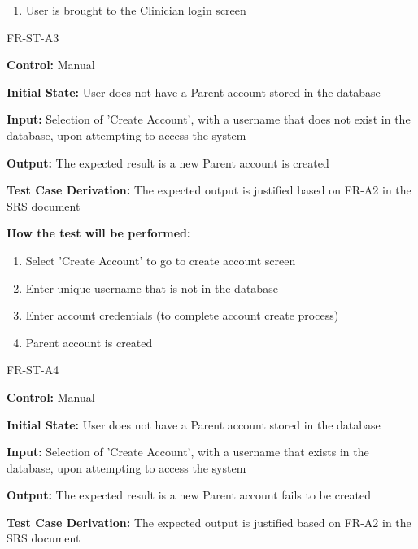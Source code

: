 \documentclass[12pt, titlepage]{article}
\begin{document}
\begin{itemize}
\begin{item}
\begin{mdframed}[linewidth=0.5mm]
\begin{enumerate}[noitemsep]
        \item User is brought to the Clinician login screen
      \end{enumerate}
  \end{mdframed}
  \end{item}
  \begin{item}
    FR-ST-A3
    \begin{mdframed}[linewidth=0.5mm]
      \textbf{Control:} Manual \par
      \textbf{Initial State:} User does not have a Parent account stored in the database \par
      \textbf{Input:} Selection of 'Create Account', with a username that does not exist in the database, upon attempting to access the system \par
      \textbf{Output:} The expected result is a new Parent account is created \par
      \textbf{Test Case Derivation:} The expected output is justified based on FR-A2 in the SRS document \par
      \textbf{How the test will be performed:}
      \begin{enumerate}[noitemsep]
        \item Select 'Create Account' to go to create account screen
        \item Enter unique username that is not in the database
        \item Enter account credentials (to complete account create process)
        \item Parent account is created
      \end{enumerate}
  \end{mdframed}
  \end{item}
  \begin{item}
    FR-ST-A4
    \begin{mdframed}[linewidth=0.5mm]
      \textbf{Control:} Manual \par
      \textbf{Initial State:} User does not have a Parent account stored in the database \par
      \textbf{Input:} Selection of 'Create Account', with a username that exists in the database, upon attempting to access the system \par
      \textbf{Output:} The expected result is a new Parent account fails to be created \par
      \textbf{Test Case Derivation:} The expected output is justified based on FR-A2 in the SRS document \par

\end{mdframed}
\end{item}
\end{itemize}
\end{document}
